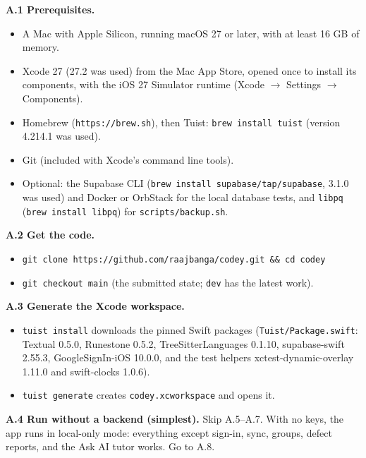 \documentclass[12pt,letterpaper]{article}
\begin{document}
\textbf{A.1 Prerequisites.}
\begin{itemize}
  \item A Mac with Apple Silicon, running macOS 27 or later, with at least
        16 GB of memory.
  \item Xcode 27 (27.2 was used) from the Mac App Store, opened once to install its components, with
        the iOS 27 Simulator runtime (Xcode $\to$ Settings $\to$ Components).
  \item Homebrew (\texttt{https://brew.sh}), then Tuist:
        \texttt{brew install tuist} (version 4.214.1 was used).
  \item Git (included with Xcode's command line tools).
  \item Optional: the Supabase CLI (\texttt{brew install supabase/tap/supabase}, 3.1.0
        was used) and Docker or OrbStack for the local database tests, and
        \texttt{libpq} (\texttt{brew install libpq}) for \texttt{scripts/backup.sh}.
\end{itemize}

\textbf{A.2 Get the code.}
\begin{itemize}
  \item \texttt{git clone https://github.com/raajbanga/codey.git \&\& cd codey}
  \item \texttt{git checkout main} (the submitted state; \texttt{dev} has the latest work).
\end{itemize}

\textbf{A.3 Generate the Xcode workspace.}
\begin{itemize}
  \item \texttt{tuist install} downloads the pinned Swift packages
        (\texttt{Tuist/Package.swift}: Textual 0.5.0, Runestone 0.5.2,
        TreeSitterLanguages 0.1.10, supabase-swift 2.55.3, GoogleSignIn-iOS 10.0.0, and the
        test helpers xctest-dynamic-overlay 1.11.0 and swift-clocks 1.0.6).
  \item \texttt{tuist generate} creates \texttt{codey.xcworkspace} and opens it.
\end{itemize}

\textbf{A.4 Run without a backend (simplest).} Skip A.5--A.7. With no keys, the app
runs in local-only mode: everything except sign-in, sync, groups, defect reports, and
the Ask AI tutor works. Go to A.8.
\end{document}
